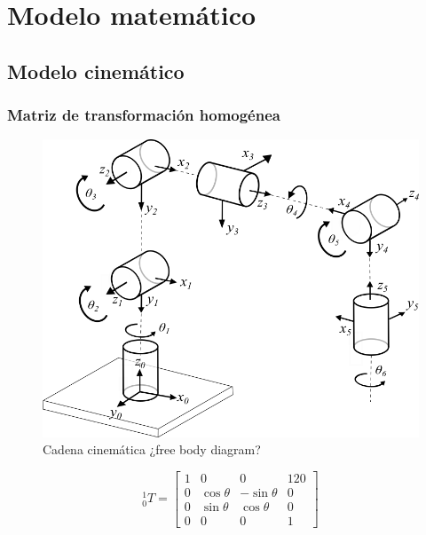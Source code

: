 \chapter{Modelo matemático}

\section{Modelo cinemático}
\subsection{Matriz de transformación homogénea}



\begin{figure}
    \centering
    \includegraphics[width=\textwidth]{./img/chapter4/kinematicchainv4.png}
    \caption{Cadena cinemática ¿free body diagram?}
    \label{fig:kinematicchain}
\end{figure}

\[
{}_{0}^{1}T = 
\begin{bmatrix}
    1 & 0 & 0 & 120  \\
    0 & \cos{\theta} & -\sin{\theta} & 0 \\
    0 & \sin{\theta} & \cos{\theta} & 0 \\
    0 & 0 & 0 & 1
\end{bmatrix}
\]
